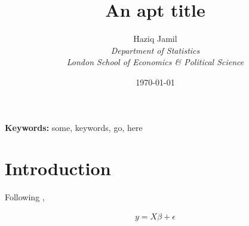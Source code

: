 \documentclass[english, 11pt]{article}\usepackage[]{graphicx}\usepackage[]{color}
\begin{document}


\title{An apt title}
\author{	Haziq Jamil\\
			\normalsize{\it{Department of Statistics}}\\
			\normalsize{\it{London School of Economics \& Political Science}}
}
\date{\normalsize\today}
\maketitle

\begin{abstract}
\lipsum[1]
\end{abstract}

{\noindent\textbf{Keywords:} 
	some, keywords, go, here
}

\section{Introduction}
%

Following \cite{jamil2017},	\lipsum[3-4]

\begin{align*}
y = X\beta + \epsilon	
\end{align*}
\end{document}
